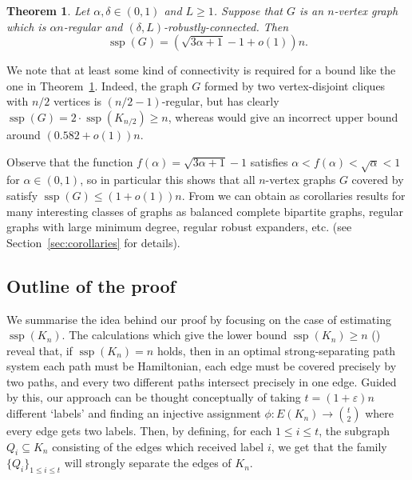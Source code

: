 \documentclass[a4paper, 11pt,reqno]{amsart}
\theoremstyle{plain}
\newtheorem{theorem}{Theorem}[section]
\theoremstyle{definition}
\numberwithin{equation}{section}
\DeclareMathOperator{\ssp}{ssp}
\newcommand{\eps}{\varepsilon}
\begin{document}
\begin{theorem} \label{theorem:regular}
  Let $\alpha, \delta \in (0,1)$ and $L \geq 1$.
  Suppose that $G$ is an $n$-vertex graph which is $\alpha n$-regular
  and $(\delta, L)$-robustly-connected. Then
  \[\ssp(G) = (\sqrt{3\alpha + 1} - 1 + o(1))n.\]
\end{theorem}

We note that at least some kind of connectivity is required for a
bound like the one in Theorem~\ref{theorem:regular}. Indeed, the graph
$G$ formed by two vertex-disjoint cliques with $n/2$ vertices is $(n/2
- 1)$-regular, but has clearly $\ssp(G) = 2\cdot\ssp(K_{n/2}) \geq n$,
whereas  would give an incorrect upper bound
around $(0.582 + o(1))n$.

Observe that the function $f(\alpha) = \sqrt{3 \alpha + 1} - 1$ satisfies
$\alpha < f(\alpha) < \sqrt{\alpha} < 1$ for {$\alpha \in (0,1)$}, so in
particular this shows that all $n$-vertex graphs $G$ covered by
 satisfy $\ssp(G) \leq (1 + o(1))n$. From
 we can obtain as corollaries results for many
interesting classes of graphs as balanced complete bipartite graphs, regular
graphs with large minimum degree, regular robust expanders, etc. 
(see Section~\ref{sec:corollaries} for details).

\subsection{Outline of the proof}

We summarise the idea behind our proof by focusing on the case of
estimating $\ssp(K_n)$.  The calculations which give the lower bound
$\ssp(K_n) \geq n$ () reveal that,
if $\ssp(K_n) = n$ holds, then in an optimal strong-separating path
system each path must be Hamiltonian, each edge must be covered
precisely by two paths, and every two different paths intersect
precisely in one edge.  Guided by this, our approach can be thought
conceptually of taking $t = (1 + \eps)n$ different `labels' and
finding an injective assignment $\phi: E(K_n) \rightarrow
\binom{t}{2}$ where every edge gets two labels.  Then, by defining,
for each $1 \leq i \leq t$, the subgraph $Q_i \subseteq K_n$
consisting of the edges which received label $i$, we get that the
family $\{Q_i\}_{1 \leq i \leq t}$ will strongly separate the edges of
$K_n$.
\end{document}

